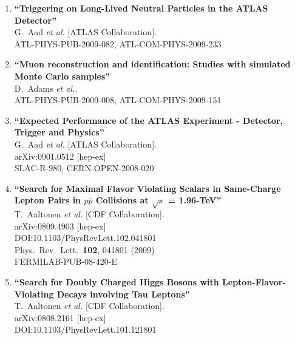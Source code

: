 \documentclass{article}
\begin{document}
\begin{enumerate}
\item%
{\bf ``Triggering on Long-Lived Neutral Particles in the ATLAS Detector''}
  \\{}G.~Aad {\it et al.} [ATLAS Collaboration].
  \\{}ATL-PHYS-PUB-2009-082, ATL-COM-PHYS-2009-233
\item%
{\bf ``Muon reconstruction and identification: Studies with simulated Monte Carlo samples''}
  \\{}D.~Adams {\it et al.}.
  \\{}ATL-PHYS-PUB-2009-008, ATL-COM-PHYS-2009-151
\item%
{\bf ``Expected Performance of the ATLAS Experiment - Detector, Trigger and Physics''}
  \\{}G.~Aad {\it et al.} [ATLAS Collaboration].
  \\{}arXiv:0901.0512 [hep-ex]
  \\{}SLAC-R-980, CERN-OPEN-2008-020
\item%
{\bf ``Search for Maximal Flavor Violating Scalars in Same-Charge Lepton Pairs in $p \bar{p}$ Collisions at $\sqrt{s}$ = 1.96-TeV''}
  \\{}T.~Aaltonen {\it et al.} [CDF Collaboration].
  \\{}arXiv:0809.4903 [hep-ex]
  \\{}DOI:10.1103/PhysRevLett.102.041801
  \\{}Phys.\ Rev.\ Lett.\  {\bf 102}, 041801 (2009)
  \\{}FERMILAB-PUB-08-420-E
\item%
{\bf ``Search for Doubly Charged Higgs Bosons with Lepton-Flavor-Violating Decays involving Tau Leptons''}
  \\{}T.~Aaltonen {\it et al.} [CDF Collaboration].
  \\{}arXiv:0808.2161 [hep-ex]
  \\{}DOI:10.1103/PhysRevLett.101.121801

\end{enumerate}
\end{document}
